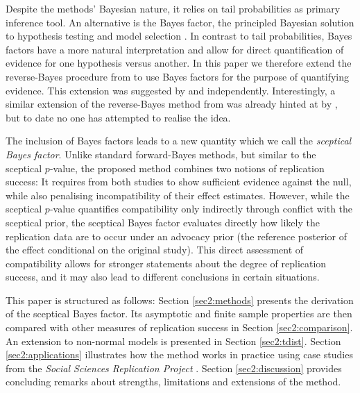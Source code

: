 Despite the methods' Bayesian nature, it relies on tail probabilities as primary
inference tool. An alternative is the Bayes factor, the principled Bayesian
solution to hypothesis testing and model selection \citep{Jeffreys1961,
Kass1995}. In contrast to tail probabilities, Bayes factors have a more natural
interpretation and allow for direct quantification of evidence for one
hypothesis versus another. In this paper we therefore extend the reverse-Bayes
procedure from \citet{Held2020} to use Bayes factors for the purpose of
quantifying evidence. This extension was suggested by \citet{Consonni2019} and
\citet{Pericchi2020} independently. Interestingly, a similar extension of the
reverse-Bayes method from \citet{Matthews2001b} was already hinted at by
\citet{Berger2001}, but to date no one has attempted to realise the idea.

The inclusion of Bayes factors leads to a new quantity which we call the
\emph{sceptical Bayes factor}. Unlike standard forward-Bayes methods, but
similar to the sceptical $p$-value, the proposed method combines two notions of
replication success: It requires from both studies to show sufficient evidence
against the null, while also penalising incompatibility of their effect
estimates. However, while the sceptical $p$-value quantifies compatibility only
indirectly through conflict with the sceptical prior, the sceptical Bayes factor
evaluates directly how likely the replication data are to occur under an
advocacy prior (the reference posterior of the effect conditional on the
original study). This direct assessment of compatibility allows for stronger
statements about the degree of replication success, and it may also lead to
different conclusions in certain situations.

This paper is structured as follows: Section \ref{sec2:methods} presents the
derivation of the sceptical Bayes factor. Its asymptotic and finite sample
properties are then compared with other measures of replication success in
Section \ref{sec2:comparison}. An extension to non-normal models is presented in
Section \ref{sec2:tdist}. Section \ref{sec2:applications} illustrates how the
method works in practice using case studies from the \emph{Social Sciences
  Replication Project} \citep{Camerer2018}. Section \ref{sec2:discussion}
provides concluding remarks about strengths, limitations and extensions of the
method.

